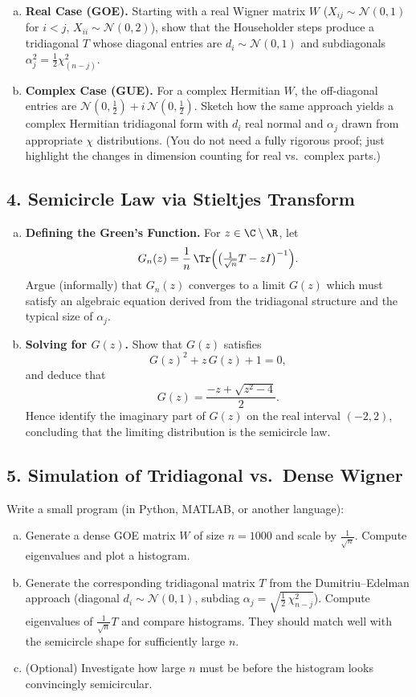 \documentclass[letterpaper,11pt,oneside,reqno]{article}
\numberwithin{equation}{section}
\theoremstyle{definition}
\begin{document}
\begin{enumerate}[(a)]
\item {\bf Real Case (GOE).} Starting with a real Wigner matrix $W$ ($X_{ij}\sim \mathcal{N}(0,1)$ for $i<j$, $X_{ii}\sim \mathcal{N}(0,2)$), show that the Householder steps produce a tridiagonal $T$ whose diagonal entries are $d_i\sim \mathcal{N}(0,1)$ and subdiagonals $\alpha_j^2 = \frac12 \chi^2_{(n-j)}$.
\item {\bf Complex Case (GUE).} For a complex Hermitian $W$, the off-diagonal entries are $\mathcal{N}(0,\tfrac12)+ i\,\mathcal{N}(0,\tfrac12)$. Sketch how the same approach yields a complex Hermitian tridiagonal form with $d_i$ real normal and $\alpha_j$ drawn from appropriate $\chi$ distributions. (You do not need a fully rigorous proof; just highlight the changes in dimension counting for real vs.\ complex parts.)
\end{enumerate}

\subsection*{4. Semicircle Law via Stieltjes Transform}

\begin{enumerate}[(a)]
\item {\bf Defining the Green’s Function.} For $z\in \C\setminus\R$, let
\[
  G_n(z) = \frac{1}{n} \,\Tr\Bigl(\bigl(\tfrac1{\sqrt{n}} T - z I\bigr)^{-1}\Bigr).
\]
Argue (informally) that $G_n(z)$ converges to a limit $G(z)$ which must satisfy an algebraic equation derived from the tridiagonal structure and the typical size of $\alpha_j$.
\item {\bf Solving for $G(z)$.} Show that $G(z)$ satisfies
\[
  G(z)^2 + z\,G(z) + 1 = 0,
\]
and deduce that
\[
  G(z) = \frac{-z + \sqrt{z^2-4}}{2}.
\]
Hence identify the imaginary part of $G(z)$ on the real interval $(-2,2)$, concluding that the limiting distribution is the semicircle law.
\end{enumerate}

\subsection*{5. Simulation of Tridiagonal vs.\ Dense Wigner}

Write a small program (in Python, MATLAB, or another language):
\begin{enumerate}[(a)]
\item Generate a dense GOE matrix $W$ of size $n=1000$ and scale by $\frac{1}{\sqrt{n}}$. Compute eigenvalues and plot a histogram.
\item Generate the corresponding tridiagonal matrix $T$ from the Dumitriu--Edelman approach (diagonal $d_i\sim \mathcal{N}(0,1)$, subdiag $\alpha_j= \sqrt{\tfrac12\,\chi^2_{n-j}}$). Compute eigenvalues of $\frac{1}{\sqrt{n}}T$ and compare histograms. They should match well with the semicircle shape for sufficiently large $n$.
\item (Optional) Investigate how large $n$ must be before the histogram looks convincingly semicircular.
\end{enumerate}
\end{document}
